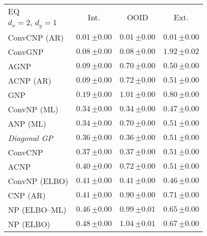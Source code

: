 \begin{tabular}[t]{lccc} 
\toprule 
EQ & \multirow{2}{*}{Int.} & \multirow{2}{*}{OOID} & \multirow{2}{*}{Ext.} \\ 
$d_x\!=\!2,\,d_y\!=\!1$ \\ \midrule 
ConvCNP (AR) & $\mathbf{0.01}\,{ \scriptstyle \pm  0.00 }$ & $\mathbf{0.01}\,{ \scriptstyle \pm  0.00 }$ & $\mathbf{0.01}\,{ \scriptstyle \pm  0.00 }$ \\ 
ConvGNP & $0.08\,{ \scriptstyle \pm  0.00 }$ & $0.08\,{ \scriptstyle \pm  0.00 }$ & $1.92\,{ \scriptstyle \pm  0.02 }$ \\ 
AGNP & $0.09\,{ \scriptstyle \pm  0.00 }$ & $0.70\,{ \scriptstyle \pm  0.00 }$ & $0.50\,{ \scriptstyle \pm  0.00 }$ \\ 
ACNP (AR) & $0.09\,{ \scriptstyle \pm  0.00 }$ & $0.72\,{ \scriptstyle \pm  0.00 }$ & $0.51\,{ \scriptstyle \pm  0.00 }$ \\ 
GNP & $0.19\,{ \scriptstyle \pm  0.00 }$ & $1.01\,{ \scriptstyle \pm  0.00 }$ & $0.80\,{ \scriptstyle \pm  0.00 }$ \\ 
ConvNP (ML) & $0.34\,{ \scriptstyle \pm  0.00 }$ & $0.34\,{ \scriptstyle \pm  0.00 }$ & $0.47\,{ \scriptstyle \pm  0.00 }$ \\ 
ANP (ML) & $0.34\,{ \scriptstyle \pm  0.00 }$ & $0.70\,{ \scriptstyle \pm  0.00 }$ & $0.51\,{ \scriptstyle \pm  0.00 }$ \\ 
{\normalshape \textit{Diagonal GP}} & $0.36\,{ \scriptstyle \pm  0.00 }$ & $0.36\,{ \scriptstyle \pm  0.00 }$ & $0.51\,{ \scriptstyle \pm  0.00 }$ \\ 
ConvCNP & $0.37\,{ \scriptstyle \pm  0.00 }$ & $0.37\,{ \scriptstyle \pm  0.00 }$ & $0.51\,{ \scriptstyle \pm  0.00 }$ \\ 
ACNP & $0.40\,{ \scriptstyle \pm  0.00 }$ & $0.72\,{ \scriptstyle \pm  0.00 }$ & $0.51\,{ \scriptstyle \pm  0.00 }$ \\ 
ConvNP (ELBO) & $0.41\,{ \scriptstyle \pm  0.00 }$ & $0.41\,{ \scriptstyle \pm  0.00 }$ & $0.46\,{ \scriptstyle \pm  0.00 }$ \\ 
CNP (AR) & $0.41\,{ \scriptstyle \pm  0.00 }$ & $0.90\,{ \scriptstyle \pm  0.00 }$ & $0.71\,{ \scriptstyle \pm  0.00 }$ \\ 
NP (ELBO--ML) & $0.46\,{ \scriptstyle \pm  0.00 }$ & $0.99\,{ \scriptstyle \pm  0.01 }$ & $0.65\,{ \scriptstyle \pm  0.00 }$ \\ 
NP (ELBO) & $0.48\,{ \scriptstyle \pm  0.00 }$ & $1.04\,{ \scriptstyle \pm  0.01 }$ & $0.67\,{ \scriptstyle \pm  0.00 }$ \\ 

\end{tabular}
